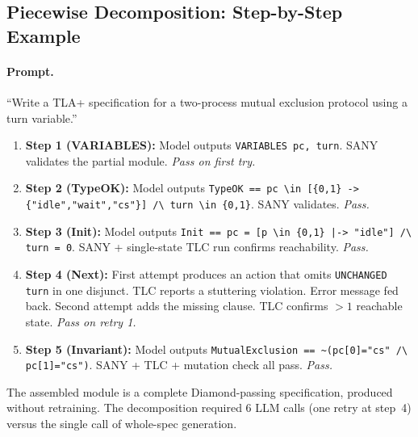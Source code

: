 \documentclass[11pt]{article}
\begin{document}
\subsection{Piecewise Decomposition: Step-by-Step Example}

\paragraph{Prompt.} ``Write a TLA+ specification for a two-process
mutual exclusion protocol using a turn variable.''

\begin{enumerate}[leftmargin=1.4em, itemsep=2pt]
\item \textbf{Step 1 (VARIABLES):} Model outputs
  \texttt{VARIABLES pc, turn}. SANY validates the partial module.
  \emph{Pass on first try.}
\item \textbf{Step 2 (TypeOK):} Model outputs
  \texttt{TypeOK == pc \textbackslash{}in [\{0,1\} -> \{"idle","wait","cs"\}]
  /\textbackslash{} turn \textbackslash{}in \{0,1\}}. SANY validates.
  \emph{Pass.}
\item \textbf{Step 3 (Init):} Model outputs
  \texttt{Init == pc = [p \textbackslash{}in \{0,1\} |-> "idle"]
  /\textbackslash{} turn = 0}. SANY + single-state TLC run confirms
  reachability. \emph{Pass.}
\item \textbf{Step 4 (Next):} First attempt produces an action that
  omits \texttt{UNCHANGED turn} in one disjunct. TLC reports a
  stuttering violation. Error message fed back. Second attempt adds
  the missing clause. TLC confirms $>1$ reachable state. \emph{Pass
  on retry 1.}
\item \textbf{Step 5 (Invariant):} Model outputs
  \texttt{MutualExclusion == \textasciitilde{}(pc[0]="cs"
  /\textbackslash{} pc[1]="cs")}. SANY + TLC + mutation check all pass.
  \emph{Pass.}
\end{enumerate}

\noindent The assembled module is a complete Diamond-passing specification,
produced without retraining. The decomposition required $6$ LLM calls
(one retry at step~4) versus the single call of whole-spec generation.
\end{document}

